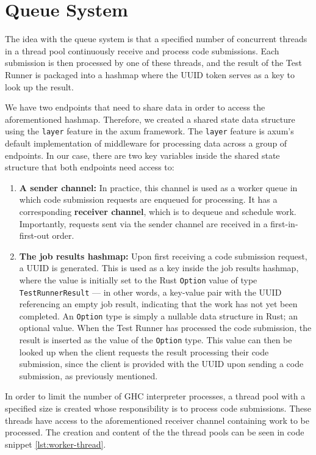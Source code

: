 \section{Queue System} \label{sec:queue-system}
The idea with the queue system is that a specified number of concurrent threads in a thread pool continuously receive and process code submissions.
Each submission is then processed by one of these threads, and the result of the Test Runner is packaged into a hashmap where the UUID token serves as a key to look up the result.

We have two endpoints that need to share data in order to access the aforementioned hashmap.
Therefore, we created a shared state data structure using the \texttt{layer} feature in the axum framework.
The \texttt{layer} feature is axum's default implementation of middleware for processing data across a group of endpoints.
In our case, there are two key variables inside the shared state structure that both endpoints need access to:
\begin{enumerate}
    \item \textbf{A sender channel:} In practice, this channel is used as a worker queue in which code submission requests are enqueued for processing. It has a corresponding \textbf{receiver channel}, which is to dequeue and schedule work. Importantly, requests sent via the sender channel are received in a first-in-first-out order.
    \item \textbf{The job results hashmap:} Upon first receiving a code submission request, a UUID is generated. This is used as a key inside the job results hashmap, where the value is initially set to the Rust \texttt{Option} value of type \\\noindent\texttt{TestRunnerResult} --- in other words, a key-value pair with the UUID referencing an empty job result, indicating that the work has not yet been completed. An \texttt{Option} type is simply a nullable data structure in Rust; an optional value. When the Test Runner has processed the code submission, the result is inserted as the value of the \texttt{Option} type. This value can then be looked up when the client requests the result processing their code submission, since the client is provided with the UUID upon sending a code submission, as previously mentioned.
\end{enumerate}

In order to limit the number of GHC interpreter processes, a thread pool with a specified size is created whose responsibility is to process code submissions.
These threads have access to the aforementioned receiver channel containing work to be processed.
The creation and content of the the thread pools can be seen in code snippet \ref{lst:worker-thread}.

